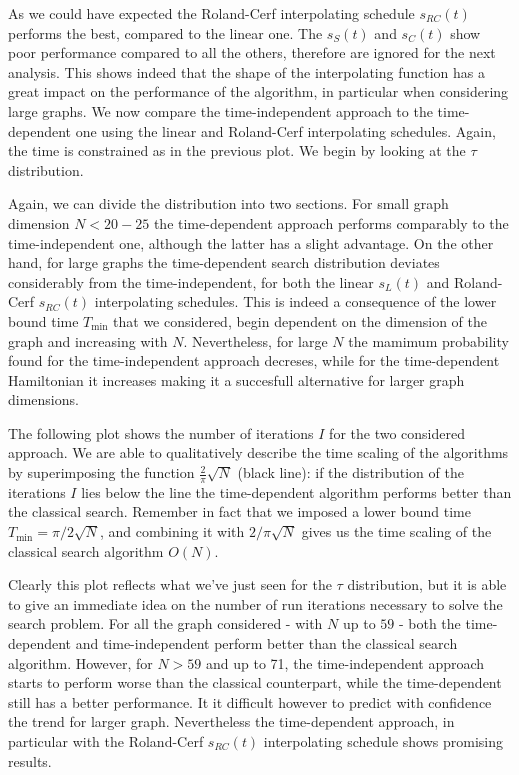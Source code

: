         As we could have expected the Roland-Cerf interpolating schedule $s_{RC}(t)$ performs the best, compared to the linear one. The $s_S(t)$ and $s_C(t)$ show poor performance compared to all the others, therefore are ignored for the next analysis.  This shows indeed that the shape of the interpolating function has a great impact on the performance of the algorithm, in particular when considering large graphs. We now compare the time-independent approach to the time-dependent one using the linear and Roland-Cerf interpolating schedules. Again, the time is constrained as in the previous plot. We begin by looking at the $\tau$ distribution. \\
        \clearpage
        
        Again, we can divide the distribution into two sections. For small graph dimension $N<20-25$ the time-dependent approach performs comparably to the time-independent one, although the latter has a slight advantage. On the other hand, for large graphs the time-dependent search distribution deviates considerably from the time-independent, for both the linear $s_L(t)$ and Roland-Cerf $s_{RC}(t)$ interpolating schedules. This is indeed a consequence of the lower bound time $T_{\min}$ that we considered, begin dependent on the dimension of the graph and increasing with $N$. Nevertheless, for large $N$ the mamimum probability found for the time-independent approach decreses, while for the time-dependent Hamiltonian it increases making it a succesfull alternative for larger graph dimensions.


        \noindent
        The following plot shows the number of iterations $I$ for the two considered approach. We are able to qualitatively describe the time scaling of the algorithms by superimposing the function $\frac{2}{\pi}\sqrt{N}$ (black line): if the distribution of the iterations $I$ lies below the line the time-dependent algorithm performs better than the classical search. Remember in fact that we imposed a lower bound time $T_{\min} = \pi /2 \sqrt{N}$, and combining it with $2/ \pi \sqrt{N}$ gives us the time scaling of the classical search algorithm $O(N)$.

        
        Clearly this plot reflects what we've just seen for the $\tau$ distribution, but it is able to give an immediate idea on the number of run iterations necessary to solve the search problem. For all the graph considered - with $N$ up to $59$ - both the time-dependent and time-independent perform better than the classical search algorithm. However, for $N>59$ and up to 71, the time-independent approach starts to perform worse than the classical counterpart, while the time-dependent still has a better performance. It it difficult however to predict with confidence the trend for larger graph. Nevertheless the time-dependent approach, in particular with the Roland-Cerf $s_{RC}(t)$ interpolating schedule shows promising results.

